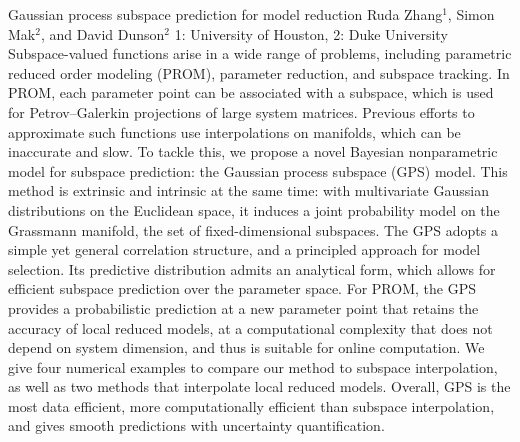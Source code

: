 \begin{addmargin}[2em]{0em}
\vspace{1.5ex}
\abs
{Gaussian process subspace prediction for model reduction}
{Ruda Zhang$^{1}$, Simon Mak$^{2}$, and David Dunson$^{2}$}
{1: University of Houston, 2: Duke University}
{Subspace-valued functions arise in a wide range of problems, including parametric reduced order modeling (PROM), parameter reduction, and subspace tracking. In PROM, each parameter point can be associated with a subspace, which is used for Petrov--Galerkin projections of large system matrices. Previous efforts to approximate such functions use interpolations on manifolds, which can be inaccurate and slow. To tackle this, we propose a novel Bayesian nonparametric model for subspace prediction: the Gaussian process subspace (GPS) model. This method is extrinsic and intrinsic at the same time: with multivariate Gaussian distributions on the Euclidean space, it induces a joint probability model on the Grassmann manifold, the set of fixed-dimensional subspaces. The GPS adopts a simple yet general correlation structure, and a principled approach for model selection. Its predictive distribution admits an analytical form, which allows for efficient subspace prediction over the parameter space. For PROM, the GPS provides a probabilistic prediction at a new parameter point that retains the accuracy of local reduced models, at a computational complexity that does not depend on system dimension, and thus is suitable for online computation. We give four numerical examples to compare our method to subspace interpolation, as well as two methods that interpolate local reduced models. Overall, GPS is the most data efficient, more computationally efficient than subspace interpolation, and gives smooth predictions with uncertainty quantification.}


\end{addmargin}
